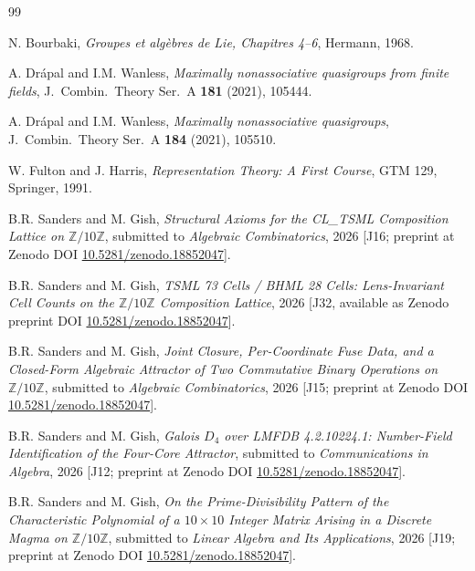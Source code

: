 \documentclass[11pt,reqno]{amsart}
\theoremstyle{definition}
\newcommand{\Z}{\mathbb{Z}}
\begin{document}
\begin{thebibliography}{99}

N. Bourbaki, \emph{Groupes et alg\`ebres de Lie, Chapitres 4--6},
Hermann, 1968.

A. Drápal and I.M. Wanless, \emph{Maximally nonassociative
quasigroups from finite fields}, J.~Combin.~Theory Ser.~A
\textbf{181} (2021), 105444.

A. Drápal and I.M. Wanless, \emph{Maximally nonassociative
quasigroups}, J.~Combin.~Theory Ser.~A \textbf{184} (2021), 105510.

W. Fulton and J. Harris, \emph{Representation Theory: A First
Course}, GTM 129, Springer, 1991.

B.R. Sanders and M. Gish, \emph{Structural Axioms for the
CL\_TSML Composition Lattice on $\Z/10\Z$}, submitted to
\emph{Algebraic Combinatorics}, 2026 [J16; preprint at Zenodo
DOI \href{https://doi.org/10.5281/zenodo.18852047}{10.5281/zenodo.18852047}].

B.R. Sanders and M. Gish, \emph{TSML 73 Cells / BHML 28 Cells:
Lens-Invariant Cell Counts on the $\Z/10\Z$ Composition Lattice},
2026 [J32, available as Zenodo preprint DOI
\href{https://doi.org/10.5281/zenodo.18852047}{10.5281/zenodo.18852047}].

B.R. Sanders and M. Gish, \emph{Joint Closure, Per-Coordinate Fuse
Data, and a Closed-Form Algebraic Attractor of Two Commutative
Binary Operations on $\Z/10\Z$}, submitted to \emph{Algebraic
Combinatorics}, 2026 [J15; preprint at Zenodo DOI
\href{https://doi.org/10.5281/zenodo.18852047}{10.5281/zenodo.18852047}].

B.R. Sanders and M. Gish, \emph{Galois $D_4$ over LMFDB 4.2.10224.1:
Number-Field Identification of the Four-Core Attractor}, submitted to
\emph{Communications in Algebra}, 2026 [J12; preprint at Zenodo DOI
\href{https://doi.org/10.5281/zenodo.18852047}{10.5281/zenodo.18852047}].

B.R. Sanders and M. Gish, \emph{On the Prime-Divisibility Pattern of
the Characteristic Polynomial of a $10 \times 10$ Integer Matrix
Arising in a Discrete Magma on $\Z/10\Z$}, submitted to
\emph{Linear Algebra and Its Applications}, 2026 [J19; preprint at
Zenodo DOI \href{https://doi.org/10.5281/zenodo.18852047}{10.5281/zenodo.18852047}].

\end{thebibliography}
\end{document}
